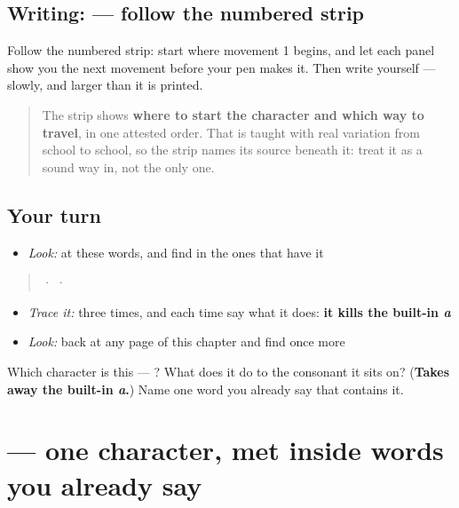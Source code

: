 \subsection*{Writing:  — follow the numbered strip}

Follow the numbered strip: start where movement 1 begins, and let each panel show you the next movement before your pen makes it. Then write  yourself — slowly, and larger than it is printed.

\begin{quote}
The strip shows \textbf{where to start the character and which way to travel}, in one attested order. That is taught with real variation from school to school, so the strip names its source beneath it: treat it as a sound way in, not the only one.
\end{quote}

\subsection*{Your turn}
\begin{itemize}
\raggedright
  \item \emph{Look:} at these words, and find  in the ones that have it
\end{itemize}

\begin{quote}
  ·    ·  
\end{quote}

\begin{itemize}
\raggedright
  \item \emph{Trace it:}  three times, and each time say what it does: \textbf{it kills the built-in \emph{a}}
  \item \emph{Look:} back at any page of this chapter and find  once more
\end{itemize}

\begin{tcolorbox}[breakable,colback=teal!4,colframe=teal!35!black,title={Before you move on}]
Which character is this — ? What does it do to the consonant it sits on? (\textbf{Takes away the built-in \emph{a}.}) Name one word you already say that contains it.
\end{tcolorbox}
\section[\texorpdfstring{\hi{ह} (ha)}{ह (ha)}]{ — one character, met inside words you already say}

